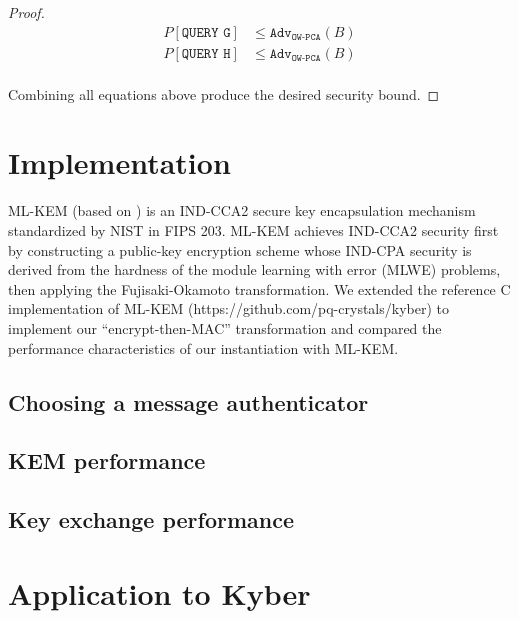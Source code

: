 \documentclass[floatrow,journal=tches,submission]{iacrtrans}
\newcommand{\adv}{\texttt{Adv}}
\begin{document}
\begin{proof}
    \begin{equation*}
        \begin{aligned}
            P\left[\texttt{QUERY G}\right] &\leq \adv_\texttt{OW-PCA}(B) \\
            P\left[\texttt{QUERY H}\right] &\leq \adv_\texttt{OW-PCA}(B) \\
        \end{aligned}
    \end{equation*}

    Combining all equations above produce the desired security bound.
\end{proof}

\section{Implementation}\label{sec:implementation}
ML-KEM (based on \cite{bos2018crystals}\cite{avanzi2019crystals}) is an IND-CCA2 secure key encapsulation mechanism standardized by NIST in FIPS 203. ML-KEM achieves IND-CCA2 security first by constructing a public-key encryption scheme whose IND-CPA security is derived from the hardness of the module learning with error (MLWE) problems, then applying the Fujisaki-Okamoto transformation. We extended the reference C implementation of ML-KEM (https://github.com/pq-crystals/kyber) to implement our ``encrypt-then-MAC'' transformation and compared the performance characteristics of our instantiation with ML-KEM.

\subsection{Choosing a message authenticator}

\subsection{KEM performance}

\subsection{Key exchange performance}

\section{Application to Kyber}\label{sec:experimental-results}
\end{document}
